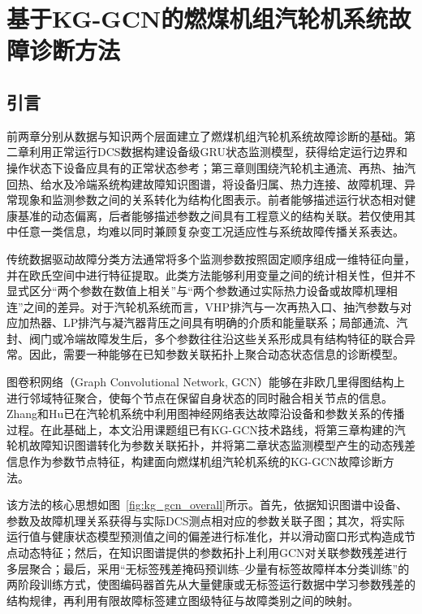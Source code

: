 \section{基于KG-GCN的燃煤机组汽轮机系统故障诊断方法}
\label{sec:kg_gcn}

\subsection{引言}

前两章分别从数据与知识两个层面建立了燃煤机组汽轮机系统故障诊断的基础。第二章利用正常运行DCS数据构建设备级GRU状态监测模型，获得给定运行边界和操作状态下设备应具有的正常状态参考；第三章则围绕汽轮机主通流、再热、抽汽回热、给水及冷端系统构建故障知识图谱，将设备归属、热力连接、故障机理、异常现象和监测参数之间的关系转化为结构化图表示。前者能够描述运行状态相对健康基准的动态偏离，后者能够描述参数之间具有工程意义的结构关联。若仅使用其中任意一类信息，均难以同时兼顾复杂变工况适应性与系统故障传播关系表达。

传统数据驱动故障分类方法通常将多个监测参数按照固定顺序组成一维特征向量，并在欧氏空间中进行特征提取。此类方法能够利用变量之间的统计相关性，但并不显式区分“两个参数在数值上相关”与“两个参数通过实际热力设备或故障机理相连”之间的差异。对于汽轮机系统而言，VHP排汽与一次再热入口、抽汽参数与对应加热器、LP排汽与凝汽器背压之间具有明确的介质和能量联系；局部通流、汽封、阀门或冷端故障发生后，多个参数往往沿这些关系形成具有结构特征的联合异常。因此，需要一种能够在已知参数关联拓扑上聚合动态状态信息的诊断模型。

图卷积网络（Graph Convolutional Network, GCN）能够在非欧几里得图结构上进行邻域特征聚合，使每个节点在保留自身状态的同时融合相关节点的信息\cite{Kipf2017GCN}。Zhang和Hu已在汽轮机系统中利用图神经网络表达故障沿设备和参数关系的传播过程\cite{ZhangHu2021FaultPropagationGNN}。在此基础上，本文沿用课题组已有KG-GCN技术路线\cite{YangHaodong2026CFB}，将第三章构建的汽轮机故障知识图谱转化为参数关联拓扑，并将第二章状态监测模型产生的动态残差信息作为参数节点特征，构建面向燃煤机组汽轮机系统的KG-GCN故障诊断方法。

该方法的核心思想如图~\ref{fig:kg_gcn_overall}所示。首先，依据知识图谱中设备、参数及故障机理关系获得与实际DCS测点相对应的参数关联子图；其次，将实际运行值与健康状态模型预测值之间的偏差进行标准化，并以滑动窗口形式构造成节点动态特征；然后，在知识图谱提供的参数拓扑上利用GCN对关联参数残差进行多层聚合；最后，采用“无标签残差掩码预训练--少量有标签故障样本分类训练”的两阶段训练方式，使图编码器首先从大量健康或无标签运行数据中学习参数残差的结构规律，再利用有限故障标签建立图级特征与故障类别之间的映射。

